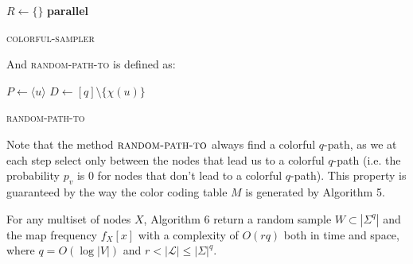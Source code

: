 \begin{algorithm}[h]
	\small
	\DontPrintSemicolon
	\BlankLine
	$R \gets \{\}$\;
	\BlankLine
	\textbf{parallel} 
	\BlankLine
	\BlankLine
	\caption{\textsc{colorful-sampler}}
	\label{alg:randomsample}
	\label{alg:sample}
\end{algorithm}

And \textsc{random-path-to} is defined as:

\begin{algorithm}[h]
	\small
	\DontPrintSemicolon
	\BlankLine
	\BlankLine
	$P\gets \langle u \rangle$\;
	$D\gets [q] \setminus \{\chi(u)\}$\;
	\BlankLine
	\BlankLine
	\BlankLine
	\caption{\textsc{random-path-to}}
	\label{alg:randomsample}
	\label{alg:sample}
\end{algorithm}

Note that the method $\textsc{random-path-to}$ always find a colorful $q$-path,
as we at each step select only between the nodes that lead us to a colorful $q$-path
(i.e. the probability $p_{v}$ is $0$ for nodes that don't lead to a colorful $q$-path).
This property is guaranteed by the way the color coding table $M$ is generated by Algorithm 5.

\begin{lemma}
	For any multiset of nodes $X$, 
	Algorithm 6 return a random sample $W \subset |\Sigma^{q}|$ and the map frequency $f_{X}[x]$
	with a complexity of $O(rq)$ both in time and space, 
	where $q = O(\log |V|)$ and $r < |\mathcal{L}| \leq |\Sigma|^{q}$.
\end{lemma}

